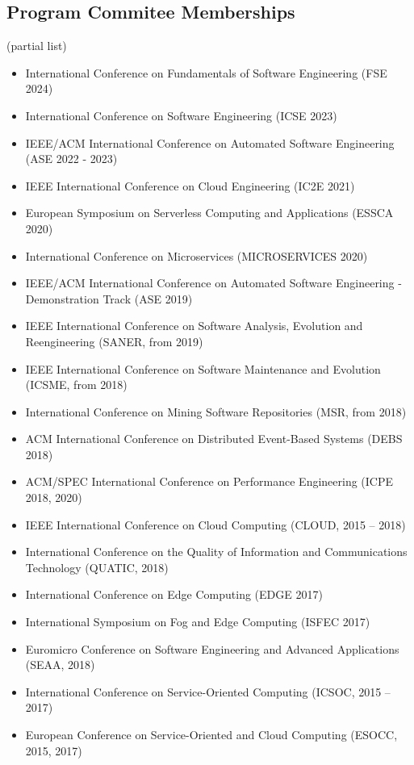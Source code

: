 \documentclass[paper=letter,fontsize=11pt]{scrartcl} %
\begin{document}
\subsection*{Program Commitee Memberships}

(partial list)

\begin{itemize}
  \item International Conference on Fundamentals of Software Engineering (FSE 2024)
  \item International Conference on Software Engineering (ICSE 2023)
  \item IEEE/ACM International Conference on Automated Software Engineering (ASE 2022 - 2023)
	\item IEEE International Conference on Cloud Engineering (IC2E 2021)
	\item European Symposium on Serverless Computing and Applications (ESSCA 2020)
	\item International Conference on Microservices (MICROSERVICES 2020)
	\item IEEE/ACM International Conference on Automated Software Engineering - Demonstration Track (ASE 2019)
	\item IEEE International Conference on Software Analysis, Evolution and Reengineering (SANER, from 2019)
	\item IEEE International Conference on Software Maintenance and Evolution (ICSME, from 2018)
	\item International Conference on Mining Software Repositories (MSR, from 2018)
  \item ACM International Conference on Distributed Event-Based Systems (DEBS 2018)
	\item ACM/SPEC International Conference on Performance Engineering (ICPE 2018, 2020)
	\item IEEE International Conference on Cloud Computing (CLOUD, 2015 -- 2018)
	\item International Conference on the Quality of Information and Communications Technology (QUATIC, 2018)
	\item International Conference on Edge Computing (EDGE 2017)
  \item International Symposium on Fog and Edge Computing (ISFEC 2017)
	\item Euromicro Conference on Software Engineering and Advanced Applications (SEAA, 2018)
	\item International Conference on Service-Oriented Computing (ICSOC, 2015 -- 2017)
  \item European Conference on Service-Oriented and Cloud Computing (ESOCC, 2015, 2017)

\end{itemize}
\end{document}
